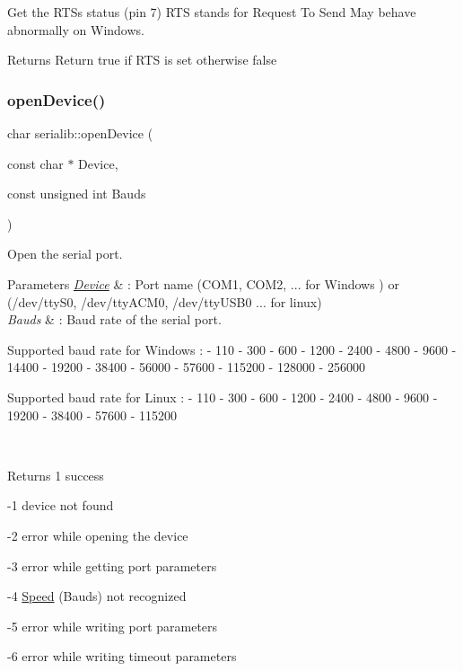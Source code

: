 Get the R\+TS\textquotesingle{}s status (pin 7) R\+TS stands for Request To Send May behave abnormally on Windows. 

\begin{DoxyReturn}{Returns}
Return true if R\+TS is set otherwise false 
\end{DoxyReturn}
\mbox{\label{classserialib_a5c2f95793e0fcd7fa6615682e8f58f16}} 
\subsubsection{\texorpdfstring{open\+Device()}{openDevice()}}
{\footnotesize\ttfamily char serialib\+::open\+Device (\begin{DoxyParamCaption}\item[{const char $\ast$}]{Device,  }\item[{const unsigned int}]{Bauds }\end{DoxyParamCaption})}



Open the serial port. 


\begin{DoxyParams}{Parameters}
{\em \hyperlink{classDevice}{Device}} & \+: Port name (C\+O\+M1, C\+O\+M2, ... for Windows ) or (/dev/tty\+S0, /dev/tty\+A\+C\+M0, /dev/tty\+U\+S\+B0 ... for linux) \\
\hline
{\em Bauds} & \+: Baud rate of the serial port. \begin{DoxyVerb}       \n Supported baud rate for Windows :
               - 110
               - 300
               - 600
               - 1200
               - 2400
               - 4800
               - 9600
               - 14400
               - 19200
               - 38400
               - 56000
               - 57600
               - 115200
               - 128000
               - 256000

      \n Supported baud rate for Linux :\n
               - 110
               - 300
               - 600
               - 1200
               - 2400
               - 4800
               - 9600
               - 19200
               - 38400
               - 57600
               - 115200
\end{DoxyVerb}
\\
\hline
\end{DoxyParams}
\begin{DoxyReturn}{Returns}
1 success 

-\/1 device not found 

-\/2 error while opening the device 

-\/3 error while getting port parameters 

-\/4 \hyperlink{classSpeed}{Speed} (Bauds) not recognized 

-\/5 error while writing port parameters 

-\/6 error while writing timeout parameters 
\end{DoxyReturn}
\mbox{\label{classserialib_ab05e51ff3bc47c02d7d000d58b45a961}} 
